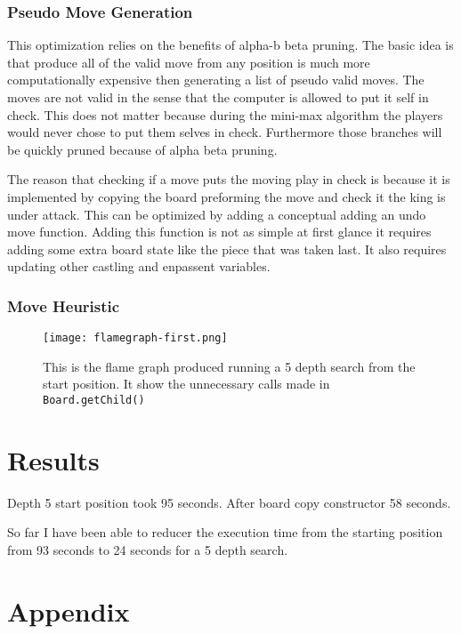 \documentclass[sigconf]{acmart}
\begin{document}
\subsubsection{Pseudo Move Generation}
This optimization relies on the benefits of alpha-b beta pruning.
The basic idea is that produce all of the valid move from any position is much more computationally expensive then generating a list of pseudo valid moves.
The moves are not valid in the sense that the computer is allowed to put it self in check.
This does not matter because during the mini-max algorithm the players would never chose to put them selves in check.
Furthermore those branches will be quickly pruned because of alpha beta pruning.

The reason that checking if a move puts the moving play in check is because it is implemented by copying the board preforming the move and check it the king is under attack.
This can be optimized by adding a conceptual  adding an undo move function.
Adding this function is not as simple at first glance it requires adding some extra board state like the piece that was taken last.
It also requires updating other castling and enpassent variables.

\subsubsection{Move Heuristic}


 
\begin{figure*}
    \centering
    \texttt{[image: flamegraph-first.png]}
    \caption{This is the flame graph produced running a 5 depth search from the start position. It show the unnecessary calls made in \texttt{Board.getChild()}}
    \label{fig:fist-flame}
\end{figure*}
\section{Results}
Depth 5 start position took 95 seconds.
After board copy constructor 58 seconds.

So far I have been able to reducer the execution time from the starting position from 93 seconds to 24 seconds for a 5 depth search.

\section{Appendix}
\end{document}
